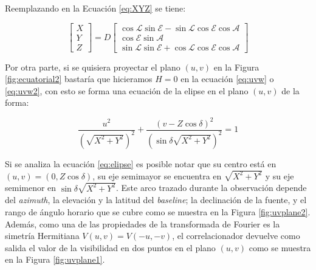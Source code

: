 Reemplazando en la Ecuación \ref{eq:XYZ} se tiene:

\begin{equation}
	\begin{bmatrix}
		X \\
		Y \\
		Z
	\end{bmatrix}
	=
	D
	\begin{bmatrix}
		\cos{\mathscr{L}}\sin{\mathscr{E}}-\sin{\mathscr{L}}\cos{\mathscr{E}}\cos{\mathscr{A}} \\
		\cos{\mathscr{E}}\sin{\mathscr{A}}                                                     \\
		\sin{\mathscr{L}}\sin{\mathscr{E}}+\cos{\mathscr{L}}\cos{\mathscr{E}}\cos{\mathscr{A}}
	\end{bmatrix}
\end{equation}


Por otra parte, si se quisiera proyectar el plano $(u,v)$ en la Figura \ref{fig:ecuatorial2} bastaría que hicieramos $H=0$ en la ecuación \ref{eq:uvw} o \ref{eq:uvw2}, con esto se forma una ecuación de la elipse en el plano $(u,v)$ de la forma:

\begin{equation}
	\frac{u^2}{(\sqrt{X^{2}+Y^{2}})^2}+\frac{(v-Z\cos{\delta})^2}{(\sin{\delta}\sqrt{X^{2}+Y^{2}})^2} = 1
	\label{eq:elipse}
\end{equation}

Si se analiza la ecuación \ref{eq:elipse} es posible notar que su centro está en $(u,v)=(0,Z\cos{\delta})$, su eje semimayor se encuentra en $\sqrt{X^{2}+Y^{2}}$ y su eje semimenor en $\sin{\delta}\sqrt{X^{2}+Y^{2}}$. Este arco trazado durante la observación depende del \textit{azimuth}, la elevación y la latitud del \textit{baseline}; la declinación de la fuente, y el rango de ángulo horario que se cubre como se muestra en la Figura \ref{fig:uvplane2}. Además, como una de las propiedades de la transformada de Fourier es la simetría Hermitiana $V(u,v)=V(-u,-v)$, el correlacionador devuelve como salida el valor de la visibilidad en dos puntos en el plano $(u,v)$ como se muestra en la Figura \ref{fig:uvplane1}.

